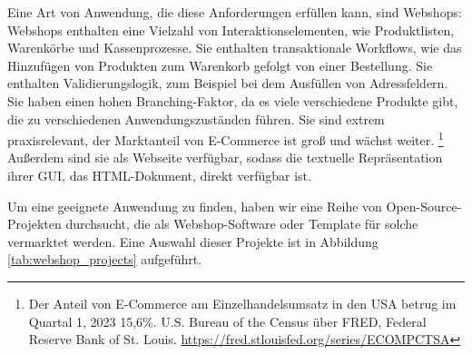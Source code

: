Eine Art von Anwendung, die diese Anforderungen erfüllen kann, sind Webshops:
Webshops enthalten eine Vielzahl von Interaktionselementen, wie Produktlisten, Warenkörbe und Kassenprozesse.
Sie enthalten transaktionale Workflows, wie das Hinzufügen von Produkten zum Warenkorb gefolgt von einer Bestellung.
Sie enthalten Validierungslogik, zum Beispiel bei dem Ausfüllen von Adressfeldern.
Sie haben einen hohen Branching-Faktor, da es viele verschiedene Produkte gibt, die zu verschiedenen Anwendungszuständen führen.
Sie sind extrem praxisrelevant, der Marktanteil von E-Commerce ist groß und wächst weiter.
\footnote{
Der Anteil von E-Commerce am Einzelhandelsumsatz in den USA betrug im Quartal 1, 2023 15,6\%. U.S. Bureau of the Census über FRED, Federal Reserve Bank of St. Louis. \url{https://fred.stlouisfed.org/series/ECOMPCTSA}}
Außerdem sind sie als Webseite verfügbar, sodass die textuelle Repräsentation ihrer GUI, das HTML-Dokument, direkt verfügbar ist.

Um eine geeignete Anwendung zu finden, haben wir eine Reihe von Open-Source-Projekten durchsucht, die als Webshop-Software oder Template für solche vermarktet werden.
Eine Auswahl dieser Projekte ist in Abbildung \ref{tab:webshop_projects} aufgeführt.

